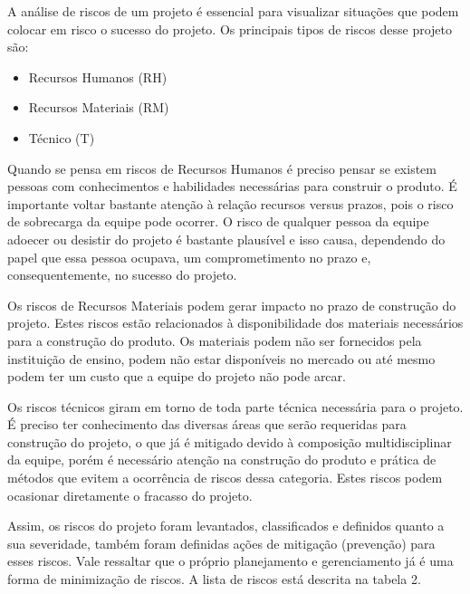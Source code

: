 A análise de riscos de um projeto é essencial para visualizar situações que podem colocar em risco o sucesso do projeto. Os principais tipos de riscos desse projeto são:

\begin{itemize}
\item Recursos Humanos (RH)
\item Recursos Materiais (RM)
\item Técnico (T)
\end{itemize}

Quando se pensa em riscos de Recursos Humanos é preciso pensar se existem pessoas com conhecimentos e habilidades necessárias para construir o produto. É importante voltar bastante atenção à relação recursos versus prazos, pois o risco de sobrecarga da equipe pode ocorrer. O risco de qualquer pessoa da equipe adoecer ou desistir do projeto é bastante plausível e isso causa, dependendo do papel que essa pessoa ocupava, um comprometimento no prazo e, consequentemente, no sucesso do projeto.

Os riscos de Recursos Materiais podem gerar impacto no prazo de construção do projeto. Estes riscos estão relacionados à disponibilidade dos materiais necessários para a construção do produto. Os materiais podem não ser fornecidos pela instituição de ensino, podem não estar disponíveis no mercado ou até mesmo podem ter um custo que a equipe do projeto não pode arcar. 

Os riscos técnicos giram em torno de toda parte técnica necessária para o projeto. É preciso ter conhecimento das diversas áreas que serão requeridas para construção do projeto, o que já é mitigado devido à composição multidisciplinar da equipe, porém é necessário atenção na construção do produto e prática de métodos que evitem a ocorrência de riscos dessa categoria. Estes riscos podem ocasionar diretamente o fracasso do projeto.
 
Assim, os riscos do projeto foram levantados, classificados e definidos quanto a sua severidade, também foram definidas ações de mitigação (prevenção) para esses riscos. Vale ressaltar que o próprio planejamento e gerenciamento já é uma forma de minimização de riscos. A lista de riscos está descrita na tabela 2.


